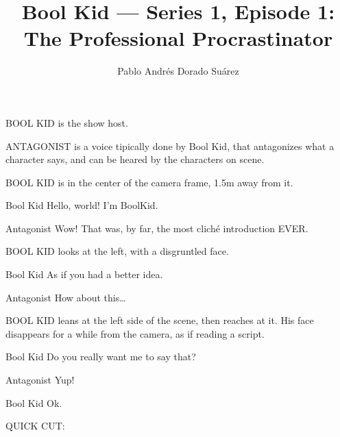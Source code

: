 \documentclass{screenplay}[2018/01/07]
\title{Bool Kid — Series 1, Episode 1: The Professional Procrastinator}
\author{Pablo Andrés Dorado Suárez}
\begin{document}
    \coverpage

    \fadein
    BOOL KID is the show host.

    ANTAGONIST is a voice tipically done by Bool Kid, that antagonizes what a character says, and can be heared by the characters on scene.

    \vspace{1em}
    \vspace{2em}


    BOOL KID is in the center of the camera frame, 1.5m away from it.

    \begin{dialogue}{Bool Kid}
        Hello, world! I'm BoolKid.
    \end{dialogue}

    \begin{dialogue}{Antagonist}
        Wow! That was, by far, the most cliché introduction EVER.
    \end{dialogue}

    BOOL KID looks at the left, with a disgruntled face.

    \begin{dialogue}{Bool Kid}
        As if you had a better idea.
    \end{dialogue}

    \begin{dialogue}{Antagonist}
        How about this\dots
    \end{dialogue}

    BOOL KID leans at the left side of the scene, then reaches at it. His face disappears for a while from the camera, as if reading a script.

    \begin{dialogue}{Bool Kid}
        Do you really want me to say that?
    \end{dialogue}

    \begin{dialogue}{Antagonist}
        Yup!
    \end{dialogue}

    \begin{dialogue}[sighing]{Bool Kid}
        Ok.
    \end{dialogue}

    \begin{flushright}
        QUICK CUT:
    \end{flushright}
\end{document}
